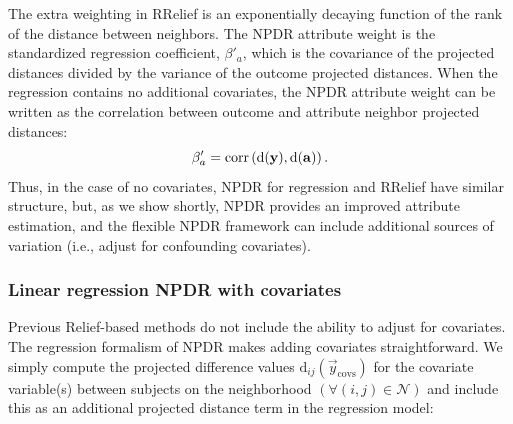 \documentclass{bioinfo}
\begin{document}
The extra weighting in RRelief is an exponentially decaying function of the rank of the distance between neighbors.
The NPDR attribute weight is the standardized regression coefficient, $\beta'_a$, which is the covariance of the projected distances divided by the variance of the outcome projected distances.
When the regression contains no additional covariates, the NPDR attribute weight can be written as the correlation between outcome and attribute neighbor projected distances:
\begin{equation}
\beta'_a = \text{corr}\left( \bf{\text{d}}(\bf{y}), \bf{\text{d}}(\bf{a}) \right).
\end{equation}
Thus, in the case of no covariates, NPDR for regression and RRelief have similar structure, but, as we show shortly, NPDR provides an improved attribute estimation, and the flexible NPDR framework can include additional sources of variation (i.e., adjust for confounding covariates).


\subsubsection{Linear regression NPDR with covariates}
Previous Relief-based methods do not include the ability to adjust for covariates.
The regression formalism of NPDR makes adding covariates straightforward.
We simply compute the projected difference values $\text{d}_{ij}(\vec{y}_{\text{covs}})$ for the covariate variable(s) between subjects on the neighborhood $(\forall(i,j) \in \mathcal{N})$ and include this as an additional projected distance term in the regression model:
\end{document}
